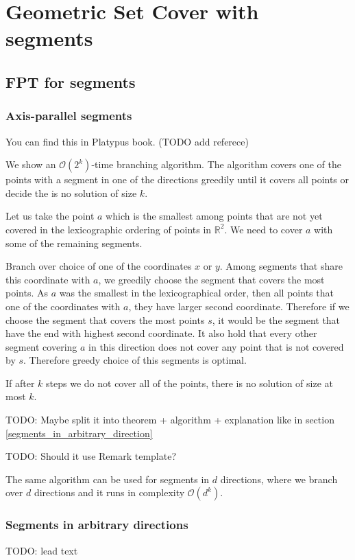 \chapter{Geometric Set Cover with segments}

\section{FPT for segments}
\subsection{Axis-parallel segments}
You can find this in Platypus book. (TODO add referece)

We show an $\mathcal{O}(2^k)$-time branching algorithm.
The algorithm covers one of the points with
a segment in one of the directions greedily until
it covers all points or decide the is no solution of size $k$.

Let us take
the point $a$ which is the smallest 
among points that are not yet covered
in the lexicographic ordering
of points in $\mathbb{R}^2$.
We need to cover $a$ with some of the remaining segments.

Branch over choice of one of the coordinates $x$ or $y$.
Among segments that share this coordinate with $a$,
we greedily choose the segment that covers the most points.
As $a$ was the smallest in the lexicographical order,
then all points that one of the coordinates with $a$,
they have larger second coordinate. Therefore
if we choose the segment that covers the most
points $s$, it would
be the segment that have the end with highest second coordinate.
It also hold that every other segment covering $a$
in this direction does not cover any point that
is not covered by $s$. Therefore greedy choice
of this segments is optimal.

If after $k$ steps we do not cover all of the points, there is no solution
of size at most $k$.

TODO: Maybe split it into theorem + algorithm + explanation like in 
section
\ref{segments_in_arbitrary_direction}

TODO: Should it use Remark template?

The same algorithm can be used for segments in $d$ directions,
where we branch over $d$ directions and it runs in complexity $\mathcal{O}(d^k)$.

\subsection{Segments in arbitrary directions}
TODO: lead text

